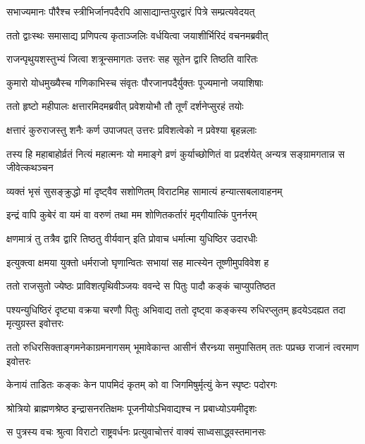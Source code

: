 \twolineshloka
{सभाज्यमानः पौरैश्च स्त्रीभिर्जानपदैरपि}
{आसाद्यान्तःपुरद्वारं पित्रे सम्प्रत्यवेदयत्}


\twolineshloka
{ततो द्वाःस्थः समासाद्य प्रणिपत्य कृताञ्जलिः}
{वर्धयित्वा जयाशीर्भिरिदं वचनमब्रवीत्}


\twolineshloka
{राजन्पृथुयशस्तुभ्यं जित्वा शत्रून्समागतः}
{उत्तरः सह सूतेन द्वारि तिष्ठति वारितः}


\twolineshloka
{कुमारो योधमुख्यैस्च गणिकाभिस्च संवृतः}
{पौरजानपदैर्युक्तः पूज्यमानो जयाशिषाः}


\twolineshloka
{ततो हृष्टो महीपालः क्षत्तारमिदमब्रवीत्}
{प्रवेशयोभौ तौ तूर्णं दर्शनेप्सुरहं तयोः}


\twolineshloka
{क्षत्तारं कुरुराजस्तु शनैः कर्ण उपाजपत्}
{उत्तरः प्रविशत्वेको न प्रवेश्या बृहन्नलाः}


\threelineshloka
{तस्य हि महाबाहोर्व्रतं नित्यं महात्मनः}
{यो ममाङ्गे व्रणं कुर्याच्छोणितं वा प्रदर्शयेत्}
{अन्यत्र सङ्ग्रामगतान्न स जीवेत्कथञ्चन}


\twolineshloka
{व्यक्तं भृसं सुसङ्क्रुद्धो मां दृष्ट्वैव सशोणितम्}
{विराटमिह सामात्यं हन्यात्सबलावाहनम्}


\twolineshloka
{इन्द्रं वापि कुबेरं वा यमं वा वरुणं तथा}
{मम शोणितकर्तारं मृद्गीयात्किं पुनर्नरम्}


\twolineshloka
{क्षणमात्रं तु तत्रैव द्वारि तिष्ठतु वीर्यवान्}
{इति प्रोवाच धर्मात्मा युधिष्ठिर उदारधीः}


\twolineshloka
{इत्युक्त्वा क्षमया युक्तो धर्मराजो घृणान्वितः}
{सभायां सह मात्स्येन तूष्णीमुपविवेश ह}


\twolineshloka
{ततो राजसुतो ज्येष्ठः प्राविशत्पृथिवीञ्जयः}
{ववन्दे स पितुः पादौ कङ्कं चाप्युपतिष्ठत}


\threelineshloka
{पश्यन्युधिष्ठिरं दृष्ट्या वक्रया चरणौ पितुः}
{अभिवाद्य ततो दृष्ट्वा कङ्कस्य रुधिरप्लुतम्}
{हृदयेऽदह्यत तदा मृत्युग्रस्त इवोत्तरः}


\threelineshloka
{ततो रुधिरसिक्ताङ्गमनेकाग्रमनागसम्}
{भूमावेकान्त आसीनं सैरन्ध्र्या समुपासितम्}
{ततः पप्रच्छ राजानं त्वरमाण इवोत्तरः}


\twolineshloka
{केनायं ताडितः कङ्कः केन पापमिदं कृतम्}
{को वा जिगमिषुर्मृत्युं केन स्पृष्टः पदोरगः}


\twolineshloka
{श्रोत्रियो ब्राह्मणश्रेष्ठ इन्द्रासनरतिक्षमः}
{पूजनीयोऽभिवाद्यश्च न प्रबाध्योऽयमीदृशः}



\twolineshloka
{स पुत्रस्य वचः श्रुत्वा विराटो राष्ट्रवर्धनः}
{प्रत्युवाचोत्तरं वाक्यं साध्वसाद्ध्वस्तमानसः}


